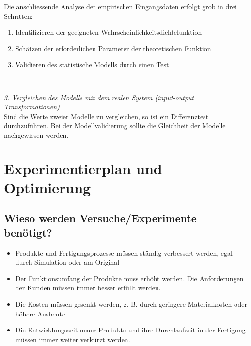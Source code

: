 \newline 
Die anschliessende Analyse der empirischen Eingangsdaten erfolgt grob in drei Schritten:
\begin{enumerate}
    \item Identifizieren der geeigneten Wahrscheinlichkeitsdichtefunktion 
    \item Schätzen der erforderlichen Parameter der theoretischen Funktion 
    \item Validieren des statistische Modells durch einen Test
\end{enumerate}
\\
\newline


\textit{3. Vergleichen des Modells mit dem realen System (input-output Transformationen)}\\
\newline 
Sind die Werte zweier Modelle zu vergleichen, so ist ein Differenztest durchzuführen.
Bei der Modellvalidierung  sollte die Gleichheit der Modelle nachgewiesen werden.
\newline 

\section{Experimentierplan und Optimierung}
\subsection{Wieso werden Versuche/Experimente benötigt?}
\begin{itemize}
    \item Produkte und Fertigungsprozesse müssen ständig verbessert werden, egal durch Simulation oder am Original 
    \item Der Funktionsumfang der Produkte muss erhöht werden. Die Anforderungen der Kunden müssen immer besser erfüllt werden. 
    \item Die Kosten müssen gesenkt werden, z. B. durch geringere Materialkosten oder höhere Ausbeute. 
    \item Die Entwicklungszeit neuer Produkte und ihre Durchlaufzeit in der Fertigung müssen immer weiter verkürzt werden. 
\end{itemize}

